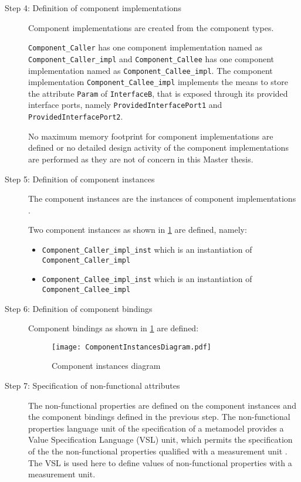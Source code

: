 \begin{description}
\item [Step 4: Definition of component implementations] Component implementations are created from the component types.

\texttt{Component\allowbreak\_Caller} has one component implementation named as \texttt{Component\allowbreak\_Caller\_impl} and \texttt{Component\allowbreak\_Callee} has one component implementation named as \texttt{Component\allowbreak\_Callee\_impl}. The component implementation \texttt{Component\allowbreak\_Callee\_impl} implements the means to store the attribute \texttt{Param} of \texttt{InterfaceB}, that is exposed through its provided interface ports, namely \texttt{Provided\allowbreak Interface\allowbreak Port1} and \texttt{Provided\allowbreak Interface\allowbreak Port2}.

No maximum memory footprint for component implementations are defined or no detailed design activity of the component implementations are performed as they are not of concern in this Master thesis.

\item [Step 5: Definition of component instances] The component instances are the instances of component implementations \cite{CompBasedProcess}.

Two component instances as shown in \cref{fig: Ex. Component instances} are defined, namely:
\begin{itemize}
\item \texttt{Component\allowbreak\_Caller\_impl\_inst} which is an instantiation of \texttt{Component\allowbreak\_Caller\_impl}
\item \texttt{Component\allowbreak\_Callee\_impl\_inst} which is an instantiation of \texttt{Component\allowbreak\_Callee\_impl}
\end{itemize}

\item [Step 6: Definition of component bindings] Component bindings as shown in \cref{fig: Ex. Component instances} are defined:

\begin{figure}[h]
	\centering
	\texttt{[image: ComponentInstancesDiagram.pdf]}
	\caption{Component instances diagram}
	\label{fig: Ex. Component instances}
\end{figure}

\item [Step 7: Specification of non-functional attributes] The non-functional properties are defined on the component instances and the component bindings defined in the previous step. The non-functional properties language unit of the specification of a metamodel provides a Value Specification Language (VSL) unit, which permits the specification of the the non-functional properties qualified with a measurement unit \cite{SpecMetamodel}. The VSL is used here to define values of non-functional properties with a measurement unit.


\end{description}

